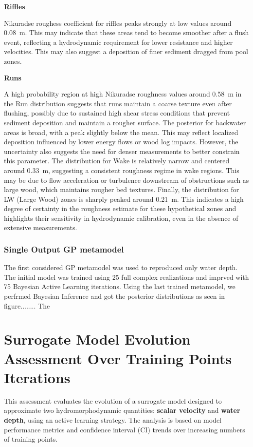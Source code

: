 \documentclass[draft,linenumbers,onecolumn]{agujournal2019} %
\begin{document}
\textbf{Riffles}

Nikuradse roughess coefficient for riffles peaks strongly at low values around 0.08~m. This may indicate that these areas tend to become smoother after a flush event, reflecting a hydrodynamic requirement for lower resistance and higher velocities. This may also suggest a deposition of finer sediment dragged from pool zones. 

\textbf{Runs}

A high probability region at high Nikuradse roughness values around 0.58~m in the Run distribution suggests that runs maintain a coarse texture even after flushing, possibly due to sustained high shear stress conditions that prevent sediment deposition and maintain a rougher surface. The posterior for backwater areas is broad, with a peak slightly below the mean. This may reflect localized deposition influenced by lower energy flows or wood log impacts. However, the uncertainty also suggests the need for denser measurements to better constrain this parameter. The distribution for Wake is relatively narrow and centered around 0.33~m, suggesting a consistent roughness regime in wake regions. This may be due to flow acceleration or turbulence downstream of obstructions such as large wood, which maintains rougher bed textures. Finally, the distribution for LW (Large Wood) zones is sharply peaked around 0.21~m. This indicates a high degree of certainty in the roughness estimate for these hypothetical zones and highlights their sensitivity in hydrodynamic calibration, even in the absence of extensive measurements.

\subsubsection{Single Output GP metamodel}
The first considered GP metamodel was used to reproduced only water depth. The initial model was trained using 25 full complex realizations and imprved with 75 Bayesian Active Learning iterations. Using the last trained metamodel, we perfrmed Bayesian Inference and got the posterior distributions as seen in figure........ The 

\section*{Surrogate Model Evolution Assessment Over Training Points Iterations}

This assessment evaluates the evolution of a surrogate model designed to approximate two hydromorphodynamic quantities: \textbf{scalar velocity} and \textbf{water depth}, using an active learning strategy. The analysis is based on model performance metrics and confidence interval (CI) trends over increasing numbers of training points.
\end{document}
